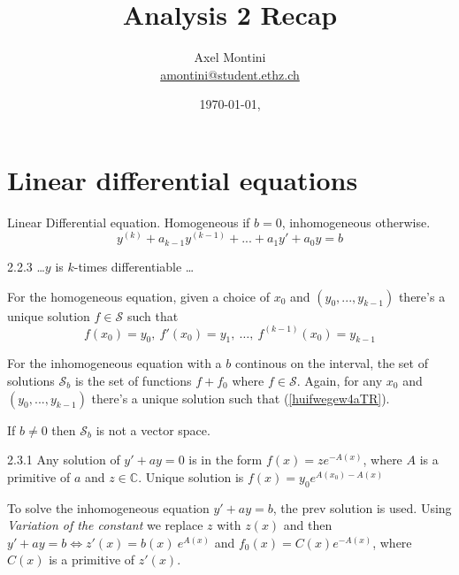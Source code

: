 \documentclass[8pt,a4paper,twocolumn,table]{extarticle}
\title{Analysis 2 Recap}
\author{Axel Montini \\ \href{mailto:amontini@student.ethz.ch}{amontini@student.ethz.ch}}
\date{\today \hfill \texttt{\branch}, \texttt{\commit}}
\newcommand{\C}{\mathbb{C}}
\begin{document}
\abovedisplayskip=0pt
\abovedisplayshortskip=0pt
\belowdisplayskip=0pt
\belowdisplayshortskip=0pt
\maketitle

\section{Linear differential equations}
\begin{definition}
    Linear Differential equation. Homogeneous if  $b = 0$, inhomogeneous otherwise.
    \[ y^{(k)} + a_{k-1} y^{(k-1)} + ... + a_1 y' + a_0 y = b \]
\end{definition}

\begin{theorem}{2.2.3}
    \dots $y$ is $k$-times differentiable \dots

    For the homogeneous equation, given a choice of $x_0$ and $(y_0, ..., y_{k-1})$
    there's a unique solution $f \in \mathcal{S}$ such that
    \begin{equation}\label{huifwegew4aTR} f(x_0) = y_0,\ f'(x_0) = y_1,\ \dots,\ f^{(k-1)}(x_0) = y_{k-1}  \end{equation}

    For the inhomogeneous equation with a $b$ continous on the interval, the set of solutions $\mathcal{S}_b$
    is the set of functions $f + f_0$ where $f \in \mathcal{S}$. Again, for any $x_0$ and $(y_0, ..., y_{k-1})$
    there's a unique solution such that (\ref{huifwegew4aTR}).

    If $b \ne 0$ then $\mathcal{S}_b$ is not a vector space.
\end{theorem}

\begin{proposition}{2.3.1}
    Any solution of $y' + ay = 0$ is in the form $f(x) = z e^{-A(x)}$, where $A$ is a primitive of $a$ and $z \in \C$.
    Unique solution is $f(x) = y_0 e^{A(x_0) - A(x)}$
\end{proposition}

To solve the inhomogeneous equation $y' + ay = b$, the prev solution is used.
Using \textit{Variation of the constant} we replace $z$ with $z(x)$ and then
$y' + ay = b \Leftrightarrow z'(x) = b(x)\ e^{A(x)}$ and $f_0(x) = C(x) e^{-A(x)}$, where
$C(x)$ is a primitive of $z'(x)$.
\end{document}

